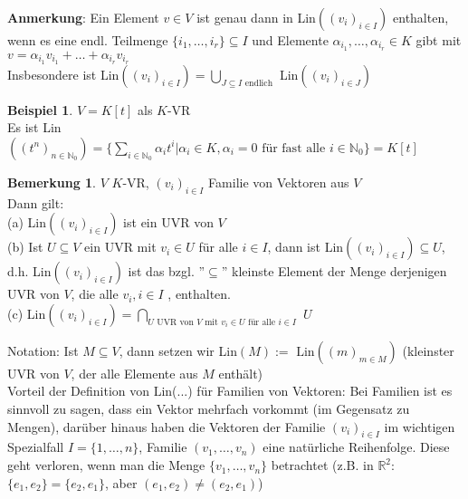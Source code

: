 \documentclass[10pt,a4paper,numbers=endperiod]{scrartcl}
\theoremstyle{definition}
\newtheorem{bem}[satz]{Bemerkung}
\newtheorem{bsp}[satz]{Beispiel}
\begin{document}
\textbf{Anmerkung}: Ein Element $v \in V$ ist genau dann in Lin$((v_i)_{i \in I})$ enthalten, wenn es eine endl. Teilmenge $\{i_1, \dots, i_r\} \subseteq I$ und Elemente $\alpha_{i_1}, \dots, \alpha_{i_r} \in K$ gibt mit $v=\alpha_{i_1}v_{i_1}+\dots+\alpha_{i_r}v_{i_r}$\\
Insbesondere ist Lin$((v_i)_{i \in I}) = \bigcup\limits_{J\subseteq I \text{ endlich}}$ Lin$((v_i)_{i \in J})$

\begin{bsp}
	$V= K[t]$ als $K$-VR\\
	Es ist Lin$((t^n)_{n \in \mathbb{N}_0})= \{\sum\limits_{i \in \mathbb{N}_0} \alpha_i t^{i}|\alpha_i \in K, \alpha_i = 0 \text{ für fast alle } i \in \mathbb{N}_0\} = K[t]$
\end{bsp}

\begin{bem}
		$V$ $K$-VR, $(v_i)_{i\in I}$ Familie von Vektoren aus $V$\\
		Dann gilt:\\
		(a) Lin$((v_i)_{i\in I})$ ist ein UVR von $V$\\
		(b) Ist $U \subseteq V$ ein UVR mit $v_i \in U$ für alle $i \in I$, dann ist Lin$((v_i)_{i\in I}) \subseteq U$, d.h. Lin$((v_i)_{i \in I})$ ist das bzgl. ''$\subseteq$'' kleinste Element der Menge derjenigen UVR von $V$, die alle $v_i, i\in I$ , enthalten.\\
		(c) Lin$((v_i)_{i\in I}) = \bigcap\limits_{U \text{ UVR von } V \text{ mit } v_i \in U \text{ für alle } i \in I }$ $U$
\end{bem}

Notation: Ist $M \subseteq V$, dann setzen wir Lin$(M) := \text{ Lin}((m)_{m\in M})$ (kleinster UVR von $V$, der alle Elemente aus $M$ enthält)\\
Vorteil der Definition von Lin(...) für Familien von Vektoren: Bei Familien ist es sinnvoll zu sagen, dass ein Vektor mehrfach vorkommt (im Gegensatz zu Mengen), darüber hinaus haben die Vektoren der Familie $(v_i)_{i\in I}$ im wichtigen Spezialfall $I=\{1,\dots,n\}$, Familie $(v_1, \dots, v_n)$ eine natürliche Reihenfolge. Diese geht verloren, wenn man die Menge $\{v_1, \dots, v_n\}$ betrachtet (z.B. in $\mathbb{R}^2$: $\{e_1,e_2\}= \{e_2,e_1\}$, aber $(e_1,e_2) \neq (e_2,e_1)$)
\end{document}
